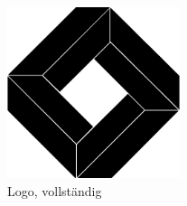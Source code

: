 \begin{figure}[H]
	\centering
	\begin{minipage}{7cm}
		\centering
		\includegraphics[keepaspectratio=true, height=5cm]{images/logo-black.png}
		\caption{Logo, vollständig}
		\label{fig:content_impl_design_logo}
	\end{minipage}
\end{figure}

